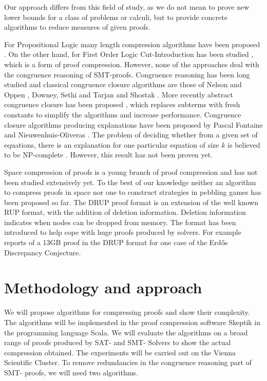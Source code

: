 Our approach differs from this field of study, as we do not mean to prove new lower bounds for a class of problems or calculi, but to provide concrete algorithms to reduce measures of given proofs.

For Propositional Logic many length compression algorithms have been proposed \cite{Bar-Ilan2008,Bloem,Boudou2013,Cotton2010,Fontaine2011}. 
On the other hand, for First Order Logic Cut-Introduction has been studied \cite{Hetzl2012}, which is a form of proof compression. However, none of the approaches deal with the congruence reasoning of SMT-proofs. 
Congruence reasoning has been long studied and classical congruence closure algorithms are those of Nelson and Oppen \cite{Nelson1980}, Downey, Sethi and Tarjan \cite{Downey1980} and Shostak \cite{Shostak1978}.
More recently abstract congruence closure has been proposed \cite{Bachmair2000}, which replaces subterms with fresh constants to simplify the algorithms and increase performance.
Congruence closure algorithms producing explanations have been proposed by Pascal Fontaine \cite{Fontaine2004} and Nieuwenhuis-Oliveras \cite{Nieuwenhuis2007,Nieuwenhuis2005}.
The problem of deciding whether from a given set of equations, there is an explanation for one particular equation of size $k$ is believed to be NP-complete \cite{Nieuwenhuis2007,Nieuwenhuis2005}.
However, this result has not been proven yet.

Space compression of proofs is a young branch of proof compression and has not been studied extensively yet.
To the best of our knowledge neither an algorithm to compress proofs in space nor one to construct strategies in pebbling games has been proposed so far. 
The DRUP proof format \cite{Heule2013} is an extension of the well known RUP format, with the addition of deletion information. 
Deletion information indicates when nodes can be dropped from memory.
The format has been introduced to help cope with huge proofs produced by solvers. 
For example \cite{Konev2014} reports of a 13GB proof in the DRUP format for one case of the Erd\H{o}s Discrepancy Conjecture.

\section{Methodology and approach}

We will propose algorithms for compressing proofs and show their complexity.
The algorithms will be implemented in the proof compression software Skeptik \cite{Boudou} in the programming language Scala.
We will evaluate the algorithms on a broad range of proofs produced by SAT- and SMT- Solvers to show the actual compression obtained.
The experiments will be carried out on the Vienna Scientific Cluster.
To remove redundancies in the congruence reasoning part of SMT- proofs, we will need two algorithms.

